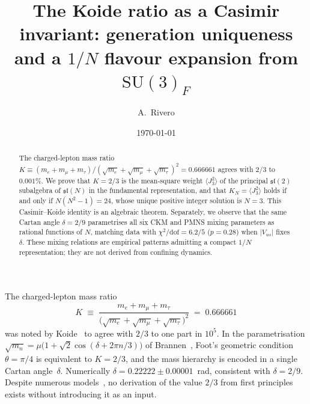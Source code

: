 \documentclass[aps,prl,twocolumn,showpacs,preprintnumbers,superscriptaddress]{revtex4-2}
\newcommand{\SU}{\mathrm{SU}}
\begin{document}
\title{The Koide ratio as a Casimir invariant: generation uniqueness
and a $1/N$ flavour expansion from $\SU(3)_F$}

\author{A.~Rivero}

\date{\today}

\begin{abstract}
The charged-lepton mass ratio
$K \equiv (m_e + m_\mu + m_\tau)/(\sqrt{m_e}+\sqrt{m_\mu}+\sqrt{m_\tau})^2
= 0.666661$ agrees with $2/3$ to $0.001\%$.
We prove that $K = 2/3$ is the mean-square weight
$\langle J_3^2\rangle$ of the principal $\mathfrak{sl}(2)$
subalgebra of $\mathfrak{sl}(N)$ in the fundamental representation,
and that $K_N = \langle J_3^2\rangle$ holds if and only if
$N(N^2-1) = 24$, whose unique positive integer solution is $N = 3$.
This Casimir--Koide identity is an algebraic theorem.
Separately, we observe that the same Cartan angle
$\delta = 2/9$ parametrises all six CKM and PMNS mixing
parameters as rational functions of $N$, matching data
with $\chi^2/\text{dof} = 6.2/5$ ($p = 0.28$) when
$|V_{us}|$ fixes~$\delta$.
These mixing relations are empirical patterns admitting a
compact $1/N$ representation; they are not derived from
confining dynamics.
\end{abstract}

\maketitle



The charged-lepton mass ratio
\begin{equation}
  K \;\equiv\; \frac{m_e + m_\mu + m_\tau}
  {\bigl(\sqrt{m_e}+\sqrt{m_\mu}+\sqrt{m_\tau}\bigr)^2}
  \;=\; 0.666661
  \label{eq:Kdef}
\end{equation}
was noted by Koide~\cite{Koide:1983} to agree with $2/3$ to
one part in $10^5$.
In the parametrisation
$\sqrt{m_n} = \mu\bigl(1 + \sqrt{2}\cos(\delta + 2\pi n/3)\bigr)$
of Brannen~\cite{Brannen:2006}, Foot's geometric
condition~\cite{Foot:1994} $\theta = \pi/4$ is equivalent to
$K = 2/3$, and the mass hierarchy is encoded in a single
Cartan angle~$\delta$.
Numerically $\delta = 0.22222 \pm 0.00001$~rad,
consistent with $\delta = 2/9$.
Despite numerous models~\cite{Koide:1983,Sumino:2009,Rivero:2024},
no derivation of the value $2/3$ from first principles exists
without introducing it as an input.
\end{document}
